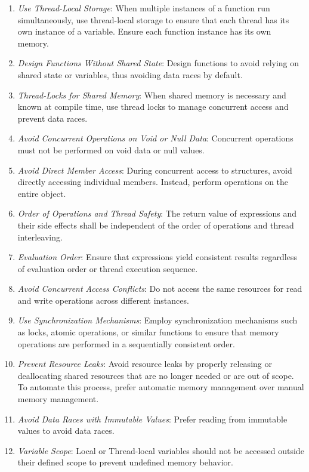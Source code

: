 \documentclass[9pt]{IEEEtran} %
\begin{document}
\begin{enumerate}
  \item \textit{Use Thread-Local Storage}: When multiple instances of a function run simultaneously, use thread-local storage to ensure that each thread has its own instance of a variable. Ensure each function instance has its own memory.
  \item \textit{Design Functions Without Shared State}: Design functions to avoid relying on shared state or variables, thus avoiding data races by default.
  \item \textit{Thread-Locks for Shared Memory}: When shared memory is necessary and known at compile time, use thread locks to manage concurrent access and prevent data races.
  \item \textit{Avoid Concurrent Operations on Void or Null Data}: Concurrent operations must not be performed on void data or null values.
  \item \textit{Avoid Direct Member Access}: During concurrent access to structures, avoid directly accessing individual members. Instead, perform operations on the entire object. 
  \item \textit{Order of Operations and Thread Safety}: The return value of expressions and their side effects shall be independent of the order of operations and thread interleaving. 
  \item \textit{Evaluation Order}: Ensure that expressions yield consistent results regardless of evaluation order or thread execution sequence. 
  \item \textit{Avoid Concurrent Access Conflicts}: Do not access the same resources for read and write operations across different instances.
  \item \textit{Use Synchronization Mechanisms}: Employ synchronization mechanisms such as locks, atomic operations, or similar functions to ensure that memory operations are performed in a sequentially consistent order.
  \item \textit{Prevent Resource Leaks}: Avoid resource leaks by properly releasing or deallocating shared resources that are no longer needed or are out of scope. To automate this process, prefer automatic memory management over manual memory management.
  \item \textit{Avoid Data Races with Immutable Values}: Prefer reading from immutable values to avoid data races.
  \item \textit{Variable Scope}: Local or Thread-local variables should not be accessed outside their defined scope to prevent undefined memory behavior.

\end{enumerate}
\end{document}
